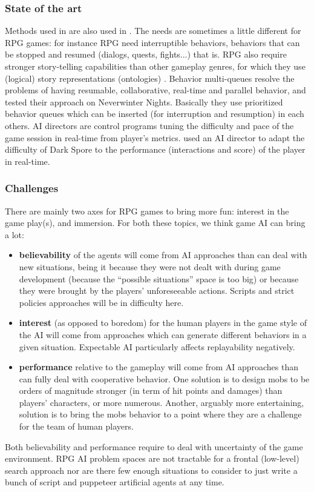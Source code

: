 \subsubsection{State of the art}

Methods used in  are also used in . The needs are sometimes a little different for RPG games: for instance RPG need interruptible behaviors, behaviors that can be stopped and resumed (dialogs, quests, fights...) that is. RPG also require stronger story-telling capabilities than other gameplay genres, for which they use (logical) story representations (ontologies) \citep{kline2009,riedl11}. Behavior multi-queues \citep{Cutumisu09} resolve the problems of having resumable, collaborative, real-time and parallel behavior, and tested their approach on Neverwinter Nights. Basically they use prioritized behavior queues which can be inserted (for interruption and resumption) in each others. AI directors are control programs tuning the difficulty and pace of the game session in real-time from player's metrics. \citet{kline2011} used an AI director to adapt the difficulty of Dark Spore to the performance (interactions and score) of the player in real-time.

\subsubsection{Challenges}

There are mainly two axes for RPG games to bring more fun: interest in the game play(s), and immersion. For both these topics, we think game AI can bring a lot:
\begin{itemize}
    \item \textbf{believability} of the agents will come from AI approaches than can deal with new situations, being it because they were not dealt with during game development (because the ``possible situations'' space is too big) or because they were brought by the players' unforeseeable actions. Scripts and strict policies approaches will be in difficulty here. %
    \item \textbf{interest} (as opposed to boredom) for the human players in the game style of the AI will come from approaches which can generate different behaviors in a given situation. Expectable AI particularly affects replayability negatively.
    \item \textbf{performance} relative to the gameplay will come from AI approaches than can fully deal with cooperative behavior. One solution is to design mobs to be orders of magnitude stronger (in term of hit points and damages) than players' characters, or more numerous. Another, arguably more entertaining, solution is to bring the mobs behavior to a point where they are a challenge for the team of human players.
\end{itemize}
Both believability and performance require to deal with uncertainty of the game environment. RPG AI problem spaces are not tractable for a frontal (low-level) search approach nor are there few enough situations to consider to just write a bunch of script and puppeteer artificial agents at any time.

